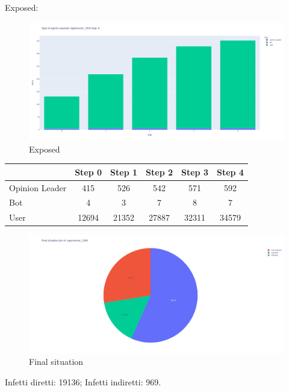         Exposed:
        \begin{figure}[H]
            \includegraphics[width=16cm]{resources/charts/eig_1500_bar.png}
            \caption{Exposed}
            \label{fig:eig_1500_bar}
        \end{figure}
        
        \begin{table}[H]
            \centering
            \begin{tabular}{|l|c|c|c|c|c|}
            \hline
                           & Step 0 & Step 1 & Step 2 & Step 3 & Step 4 \\ \hline
            Opinion Leader & 415    & 526    & 542    & 571    & 592    \\ \hline
            Bot            & 4      & 3      & 7      & 8      & 7      \\ \hline
            User           & 12694  & 21352  & 27887  & 32311  & 34579  \\ \hline
            \end{tabular}
        \end{table}
        
        \begin{figure}[H]
            \includegraphics[width=16cm]{resources/charts/eig_1500_pie.png}
            \caption{Final situation}
            \label{fig:btw_1500_pie}
        \end{figure}
        Infetti diretti: 19136;\newline
        Infetti indiretti: 969.
        
